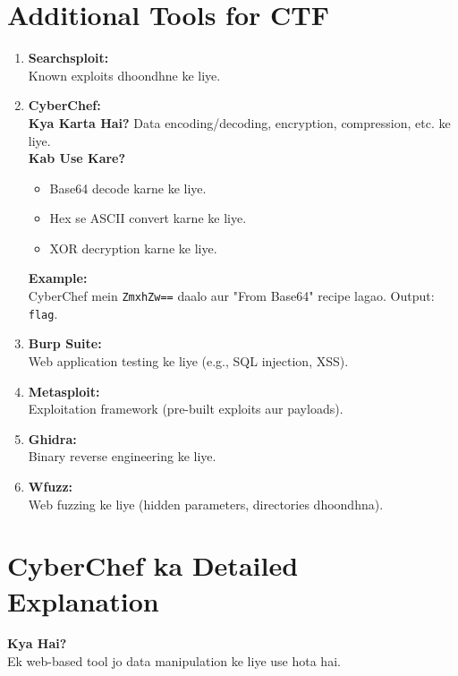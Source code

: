 \documentclass[a4paper]{article}
\begin{document}
\section{Additional Tools for CTF}
\begin{enumerate}
  \item \textbf{Searchsploit:} \\
    Known exploits dhoondhne ke liye.
  \item \textbf{CyberChef:} \\
    \textbf{Kya Karta Hai?} Data encoding/decoding, encryption, compression, etc. ke liye. \\
    \textbf{Kab Use Kare?} \\
    \begin{itemize}
      \item Base64 decode karne ke liye.
      \item Hex se ASCII convert karne ke liye.
      \item XOR decryption karne ke liye.
    \end{itemize}
    \textbf{Example:} \\
    CyberChef mein \texttt{ZmxhZw==} daalo aur "From Base64" recipe lagao. Output: \texttt{flag}.
  \item \textbf{Burp Suite:} \\
    Web application testing ke liye (e.g., SQL injection, XSS).
  \item \textbf{Metasploit:} \\
    Exploitation framework (pre-built exploits aur payloads).
  \item \textbf{Ghidra:} \\
    Binary reverse engineering ke liye.
  \item \textbf{Wfuzz:} \\
    Web fuzzing ke liye (hidden parameters, directories dhoondhna).
\end{enumerate}

\section{CyberChef ka Detailed Explanation}
\textbf{Kya Hai?} \\
Ek web-based tool jo data manipulation ke liye use hota hai. \\
\end{document}
